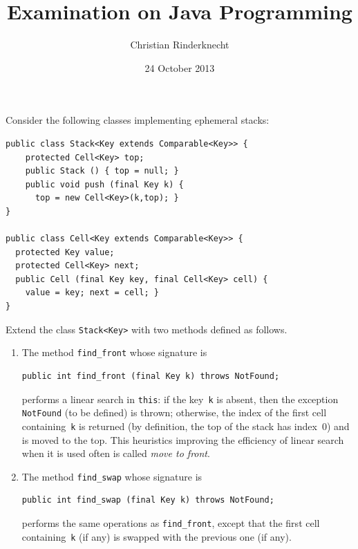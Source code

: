 \documentclass[11pt,a4paper]{article}
\title{Examination on Java Programming}
\author{Christian Rinderknecht}
\date{24 October 2013}
\begin{document}
\maketitle

\noindent Consider the following classes implementing ephemeral
stacks:
\begin{verbatim}
public class Stack<Key extends Comparable<Key>> {
    protected Cell<Key> top;
    public Stack () { top = null; }
    public void push (final Key k) {
      top = new Cell<Key>(k,top); }
}

public class Cell<Key extends Comparable<Key>> {
  protected Key value;
  protected Cell<Key> next;
  public Cell (final Key key, final Cell<Key> cell) {
    value = key; next = cell; }
}
\end{verbatim}
Extend the class \texttt{Stack<Key>} with two methods defined as follows.
\begin{enumerate}

  \item The method \texttt{find\_front} whose signature is
\begin{verbatim}
public int find_front (final Key k) throws NotFound;
\end{verbatim}
    performs a linear search in \texttt{this}: if the key~\texttt{k}
    is absent, then the exception \texttt{NotFound} (to be defined) is
    thrown; otherwise, the index of the first cell
    containing~\texttt{k} is returned (by definition, the top of the
    stack has index~\(0\)) and is moved to the top. This heuristics
    improving the efficiency of linear search when it is used often is
    called \emph{move to front}.

  \item The method \texttt{find\_swap} whose signature is
\begin{verbatim}
public int find_swap (final Key k) throws NotFound;
\end{verbatim}
    performs the same operations as \texttt{find\_front}, except that
    the first cell containing~\texttt{k} (if any) is swapped with the
    previous one (if any).
\end{enumerate}

\newpage
\end{document}
